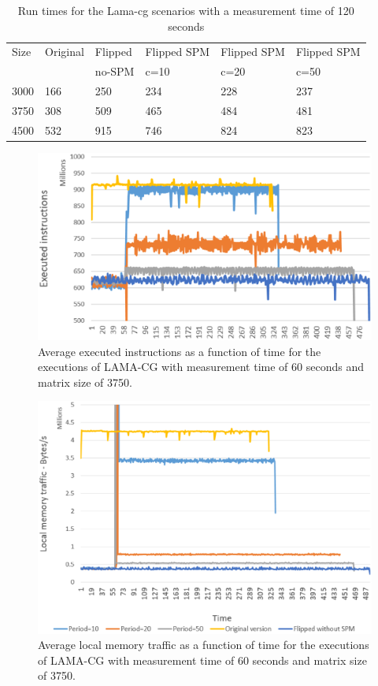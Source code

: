 \begin{table}
	\centering
		\begin{tabularx}{\textwidth}{|l|l|l|l|l|X|}
		\hline
			Size & Original & Flipped & Flipped SPM & Flipped SPM  & Flipped SPM \\
			 &  &  no-SPM & c=10  &c=20 &c=50\\
			\hline
			3000 & 166 & 250 & 234 & 228 & 237\\
			\hline
			3750 & 308 & 509 & 465 & 484 & 481\\
			\hline
			4500 & 532 & 915 & 746 & 824 & 823\\
			\hline
		\end{tabularx}
		\caption{Run times for the Lama-cg scenarios with a measurement time of 120 seconds}
		\label{table:lamatim120}
\end{table}
\begin{figure}
	\centering
		\includegraphics[width=.8\textwidth]{figures/lama-thrput.eps}
		\caption{Average executed instructions as a function of time for the executions of LAMA-CG with measurement time of 60 seconds and matrix size of 3750.}
		\label{fig:res-lamatrg}
\end{figure}

\begin{figure}[t]
	\centering
		\includegraphics[width=\textwidth]{figures/lama-localtr.eps}
		\caption{Average local memory traffic as a function of time for the executions of LAMA-CG with measurement time of 60 seconds and matrix size of 3750.}
		\label{fig:res-lamaloctr}
\end{figure}

